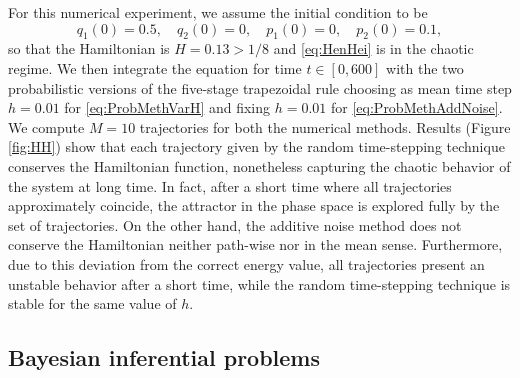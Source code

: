 \documentclass{siamart1116}
\numberwithin{theorem}{section}
\begin{document}
For this numerical experiment, we assume the initial condition to be
\begin{equation}
	q_1(0) = 0.5,\quad q_2(0) = 0, \quad p_1(0) = 0, \quad p_2(0) = 0.1,
\end{equation}
so that the Hamiltonian is $H = 0.13 > 1/8$ and \eqref{eq:HenHei} is in the chaotic regime. We then integrate the equation for time $t \in [0, 600]$ with the two probabilistic versions of the five-stage trapezoidal rule choosing as mean time step $h = 0.01$ for \eqref{eq:ProbMethVarH} and fixing $h = 0.01$ for \eqref{eq:ProbMethAddNoise}. We compute $M = 10$ trajectories for both the numerical methods. Results (Figure \ref{fig:HH}) show that each trajectory given by the random time-stepping technique conserves the Hamiltonian function, nonetheless capturing the chaotic behavior of the system at long time. In fact, after a short time where all trajectories approximately coincide, the attractor in the phase space is explored fully by the set of trajectories. On the other hand, the additive noise method does not conserve the Hamiltonian neither path-wise nor in the mean sense. Furthermore, due to this deviation from the correct energy value, all trajectories present an unstable behavior after a short time, while the random time-stepping technique is stable for the same value of $h$.

\subsection{Bayesian inferential problems} 
\end{document}
